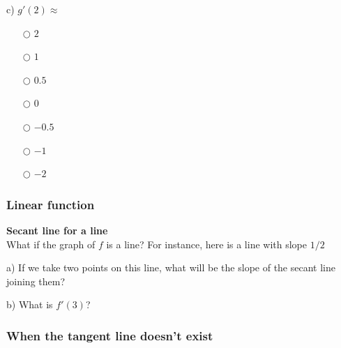\documentclass[pdftex, brazil, 12pt, twoside]{article}
\begin{document}
\begin{exercise}
  c) $g'(2) \approx$
  \begin{itemize}[noitemsep]
  \item[$\bigcirc$] $2$
  \item[$\bigcirc$] $1$
  \item[$\bigcirc$] $0.5$
  \item[$\bigcirc$] $0$
  \item[$\bigcirc$] $-0.5$
  \item[$\bigcirc$] $-1$
  \item[$\bigcirc$] $-2$
  \end{itemize}
\end{exercise}

\subsubsection{Linear function}
\label{u1-geometric-linear-function}

\begin{exercise}
  \textbf{Secant line for a line}\\%
  What if the graph of $f$ is a line? For instance, here is a line with slope $1/2$
  \begin{figure}[H]
    \begin{center}
    \end{center}
  \end{figure}
  a) If we take two points on this line, what will be the slope of the secant line
  joining them?

  b) What is $f'(3)$?
\end{exercise}

\subsubsection{When the tangent line doesn't exist}
\label{u1-geometric-when-tanget-doesnt-exist}
\end{document}
